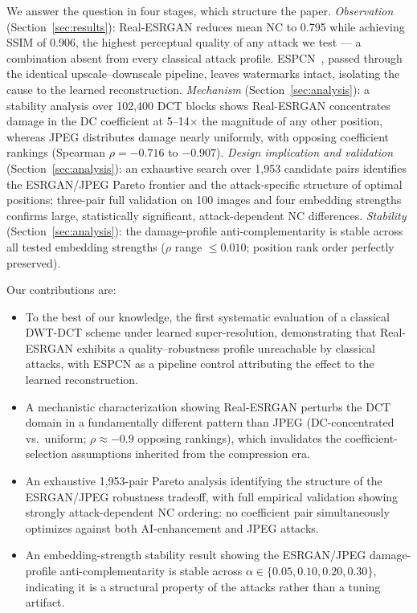 \documentclass[conference]{IEEEtran}
\begin{document}
We answer the question in four stages, which structure the paper.
\emph{Observation} (Section~\ref{sec:results}): Real-ESRGAN reduces
mean NC to 0.795 while achieving SSIM of 0.906, the highest perceptual
quality of any attack we test --- a combination absent from every
classical attack profile. ESPCN~\cite{espcn2016}, passed through the
identical upscale--downscale pipeline, leaves watermarks intact,
isolating the cause to the learned reconstruction.
\emph{Mechanism} (Section~\ref{sec:analysis}): a stability analysis over
102,400 DCT blocks shows Real-ESRGAN concentrates damage in the DC
coefficient at 5--14$\times$ the magnitude of any other position, whereas
JPEG distributes damage nearly uniformly, with opposing coefficient
rankings (Spearman $\rho = -0.716$ to $-0.907$).
\emph{Design implication and validation}
(Section~\ref{sec:analysis}): an exhaustive search over 1,953 candidate
pairs identifies the ESRGAN/JPEG Pareto frontier and the attack-specific
structure of optimal positions; three-pair full validation on 100 images
and four embedding strengths confirms large, statistically significant,
attack-dependent NC differences.
\emph{Stability} (Section~\ref{sec:analysis}): the damage-profile
anti-complementarity is stable across all tested embedding strengths
($\rho$ range $\leq 0.010$; position rank order perfectly preserved).

Our contributions are:
\begin{itemize}
\item To the best of our knowledge, the first systematic evaluation of
a classical DWT-DCT scheme under learned super-resolution, demonstrating
that Real-ESRGAN exhibits a quality--robustness profile unreachable by
classical attacks, with ESPCN as a pipeline control attributing the
effect to the learned reconstruction.
\item A mechanistic characterization showing Real-ESRGAN perturbs the
DCT domain in a fundamentally different pattern than JPEG (DC-concentrated
vs.\ uniform; $\rho \approx -0.9$ opposing rankings), which invalidates
the coefficient-selection assumptions inherited from the compression era.
\item An exhaustive 1,953-pair Pareto analysis identifying the structure
of the ESRGAN/JPEG robustness tradeoff, with full empirical validation
showing strongly attack-dependent NC ordering: no coefficient pair
simultaneously optimizes against both AI-enhancement and JPEG attacks.
\item An embedding-strength stability result showing the ESRGAN/JPEG
damage-profile anti-complementarity is stable across
$\alpha \in \{0.05, 0.10, 0.20, 0.30\}$, indicating it is a structural
property of the attacks rather than a tuning artifact.
\end{itemize}
\end{document}
